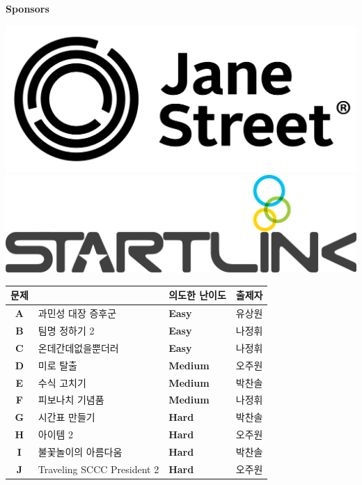     \begin{frame}{\textbf{Sponsors}}
        \begin{center}
            \includegraphics[width=0.36\linewidth]{images/logos/JaneStreet.png}\\
            \vspace{10mm}
            \includegraphics[width=0.36\linewidth]{images/logos/startlink.png}
        \end{center}
    \end{frame}
    
    \begin{frame} %
        \begin{center}
            \begin{tabular}{cl|l|l}
                \hline
                문제 & & 의도한 난이도 & 출제자 \\
                \hline
                \hline
                \textbf{A} & 과민성 대장 증후군 & \textbf{\color{acbronze} Easy} & 유상원 \\
                \textbf{B} & 팀명 정하기 2 & \textbf{\color{acbronze} Easy} & 나정휘 \\
                \textbf{C} & 온데간데없을뿐더러 & \textbf{\color{acbronze} Easy} & 나정휘 \\
                \textbf{D} & 미로 탈출 & \textbf{\color{acsilver} Medium} & 오주원 \\
                \textbf{E} & 수식 고치기 & \textbf{\color{acsilver} Medium} & 박찬솔 \\
                \textbf{F} & 피보나치 기념품 & \textbf{\color{acsilver} Medium} & 나정휘 \\
                \textbf{G} & 시간표 만들기 & \textbf{\color{acgold} Hard} & 박찬솔 \\
                \textbf{H} & 아이템 2 & \textbf{\color{acgold} Hard} & 오주원 \\
                \textbf{I} & 불꽃놀이의 아름다움 & \textbf{\color{acgold} Hard} & 박찬솔 \\
                \textbf{J} & Traveling SCCC President 2 & \textbf{\color{acgold} Hard} & 오주원 \\
                \hline
            \end{tabular}
        \end{center}
    \end{frame}

